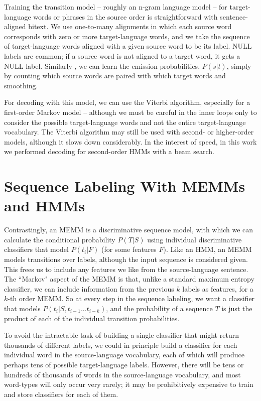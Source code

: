 Training the transition model -- roughly an n-gram language model -- for
target-language words or phrases in the source order is straightforward with
sentence-aligned bitext. We use one-to-many alignments in which each source
word corresponds with zero or more target-language words, and we take the
sequence of target-language words aligned with a given source word to be its
label. NULL labels are common; if a source word is not aligned to a target
word, it gets a NULL label. Similarly , we can learn the emission
probabilities, $P(s|t)$, simply by counting which source words are paired with
which target words and smoothing.

For decoding with this model, we can use the Viterbi algorithm, especially for
a first-order Markov model -- although we must be careful in the inner loops
only to consider the possible target-language words and not the entire
target-language vocabulary. The Viterbi algorithm may still be used with
second- or higher-order models, although it slows down considerably. In the
interest of speed, in this work we performed decoding for second-order HMMs
with a beam search.

\section{Sequence Labeling With MEMMs and HMMs}
Contrastingly, an MEMM is a discriminative sequence model, with
which we can calculate the conditional probability $P(T|S)$ using individual
discriminative classifiers that model $P(t_i | F)$ (for some features $F$).
Like an HMM, an MEMM models transitions over labels, although the
input sequence is considered given. This frees us to include any features we
like from the source-language sentence. The ``Markov" aspect of the MEMM is
that, unlike a standard maximum entropy classifier, we can include information
from the previous $k$ labels as features, for a $k$-th order MEMM. So at every
step in the sequence labeling, we want a classifier that models 
$P(t_i | S, t_{i-1}...t_{i-k})$, and the probability of a sequence $T$ is just
the product of each of the individual transition probabilities.

To avoid the intractable task of building a single classifier that might return
thousands of different labels, we could in principle build a classifier for
each individual word in the source-language vocabulary, each of which will
produce perhaps tens of possible target-language labels. However, there will be
tens or hundreds of thousands of words in the source-language vocabulary, and
most word-types will only occur very rarely; it may be prohibitively expensive
to train and store classifiers for each of them.

